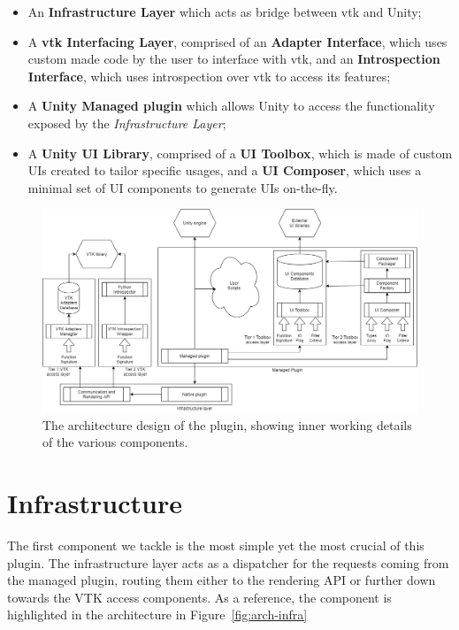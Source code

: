 \begin{itemize}
    \item An \textbf{Infrastructure Layer} which acts as bridge between \acrshort{vtk} and Unity;
    \item A \textbf{\acrshort{vtk} Interfacing Layer}, comprised of an \textbf{Adapter Interface}, which uses custom made code by the user to interface with \acrshort{vtk}, and an \textbf{Introspection Interface}, which uses introspection over \acrshort{vtk} to access its features;
    \item A \textbf{Unity Managed plugin} which allows Unity to access the functionality exposed by the \textit{Infrastructure Layer};
    \item A \textbf{Unity UI Library}, comprised of a \textbf{UI Toolbox}, which is made of custom UIs created to tailor specific usages, and a \textbf{UI Composer}, which uses a minimal set of UI components to generate UIs on-the-fly.
\end{itemize}

\begin{figure}[t]
    \centering
    \includegraphics[width=\textwidth]{pictures/Architecture-v0.3.png}
    \caption{The architecture design of the plugin, showing inner working details of the various components.}
    \label{fig:high-level-architecture}
\end{figure}

\section{Infrastructure}
\label{sec:design-infrastructure}

The first component we tackle is the most simple yet the most crucial of this plugin. The infrastructure layer acts as a dispatcher for the requests coming from the managed plugin, routing them either to the rendering API or further down towards the VTK access components. As a reference, the component is highlighted in the architecture in Figure~\ref{fig:arch-infra}

